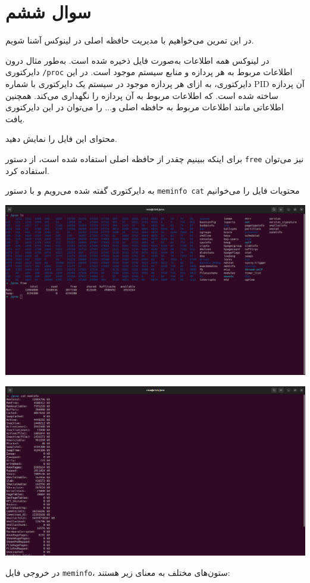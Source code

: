\section{سوال ششم}

در این تمرین می‌خواهیم با مدیریت حافظه اصلی در لینوکس آشنا شویم.

در لینوکس همه اطلاعات به‌صورت فایل ذخیره شده است. به‌طور مثال درون دایرکتوری \texttt{/proc} اطلاعات مربوط به هر پردازه و منابع سیستم موجود است. در این دایرکتوری، به ازای هر پردازه موجود در سیستم یک دایرکتوری با شماره PID آن پردازه ساخته شده است. که اطلاعات مربوط به آن پردازه را نگهداری می‌کند. همچنین اطلاعاتی مانند اطلاعات مربوط به حافظه اصلی و... را می‌توان در این دایرکتوری یافت.

محتوای این فایل را نمایش دهید.

برای اینکه ببینیم چقدر از حافظه اصلی استفاده شده است، از دستور \texttt{free} نیز می‌توان استفاده کرد.

\begin{qsolve}
	به دایرکتوری گفته شده می‌رویم و با دستور \texttt{meminfo cat} محتویات فایل را می‌خوانیم

	\begin{center}
		\includegraphics[width=\textwidth]{pics/img4.png}
	\end{center}
	
	\begin{center}
		\includegraphics[width=\textwidth]{pics/img8.png}
	\end{center}
	
	در خروجی فایل \texttt{meminfo}، ستون‌های مختلف به معنای زیر هستند:
	
	


\end{qsolve}

